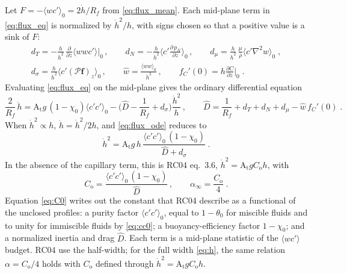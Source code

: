 \documentclass[11pt]{article}
\numberwithin{equation}{section}
\newcommand{\avg}[1]{\langle #1\rangle}
\newcommand{\At}{\mathrm{A_t}}
\newcommand{\hd}{\dot h}
\newcommand{\pd}[2]{\frac{\partial #1}{\partial #2}}
\begin{document}
Let $F = -\avg{w c'}_0 = 2 \hd/R_f$ from \eqref{eq:flux_mean}. Each mid-plane term in \eqref{eq:flux_eq} is normalized by $\hd^2/h$, with signs chosen so that a positive value is a sink of $F$:
\begin{equation}\label{eq:groups}
\begin{gathered}
d_T = -\frac{h}{\hd^2} \, \pd{}{z} \avg{w w c'} \Big|_0 \, , \qquad
d_N = -\frac{h}{\hd^2} \Big\langle c' \pd{\, p_N}{z}\Big\rangle_0 \, , \qquad
d_\mu = \frac{h}{\hd^2} \, \frac{\mu}{\bar\rho} \avg{c' \nabla^2 w}_0 \;, \\
d_\sigma = \frac{h}{\hd^2} \avg{c'(\mathcal P \mathbf f)_z}_0 \, , \qquad
\hat w = \frac{\avg{w w}_0}{\hd^2} \, , \qquad f_C'(0) = h \pd{C}{z} \Big|_0 \;.
\end{gathered}
\end{equation}
Evaluating \eqref{eq:flux_eq} on the mid-plane gives the ordinary differential equation
\begin{equation}\label{eq:flux_ode}
\frac{2}{R_f} \, \ddot h = \At g \,(1 - \chi_0) \avg{c' c'}_0 - \Big(\hat D - \frac{1}{R_f} + d_\sigma\Big) \frac{\hd^2}{h} \, , \qquad
\hat D = \frac{1}{R_f} + d_T + d_N + d_\mu - \hat w \, f_C'(0) \;.
\end{equation}
When $\hd^2 \propto h$, $\ddot h = \hd^2/2 h$, and \eqref{eq:flux_ode} reduces to
\begin{equation}\label{eq:alpha_RC}
\hd^2 = \At g \, h \, \frac{\avg{c' c'}_0 \,(1 - \chi_0)}{\hat D + d_\sigma} \;.
\end{equation}
In the absence of the capillary term, this is RC04 eq.~3.6, $\hd^2 = \At g C_\mathrm{o} h$, with
\begin{equation}\label{eq:C0}
C_\mathrm{o} = \frac{\avg{c' c'}_0 \,(1 - \chi_0)}{\hat D} \, , \qquad \alpha_\infty = \frac{C_\mathrm{o}}{4} \;.
\end{equation}
Equation \eqref{eq:C0} writes out the constant that RC04 describe as a functional of the unclosed profiles: a purity factor $\avg{c' c'}_0$, equal to $1 - \theta_0$ for miscible fluids and to unity for immiscible fluids by \eqref{eq:cc0}; a buoyancy-efficiency factor $1 - \chi_0$; and a normalized inertia and drag $\hat D$. Each term is a mid-plane statistic of the $\avg{w c'}$ budget. RC04 use the half-width; for the full width \eqref{eq:h}, the same relation $\alpha = C_\mathrm{o}/4$ holds with $C_\mathrm{o}$ defined through $\hd^2 = \At g C_\mathrm{o} h$.
\end{document}
